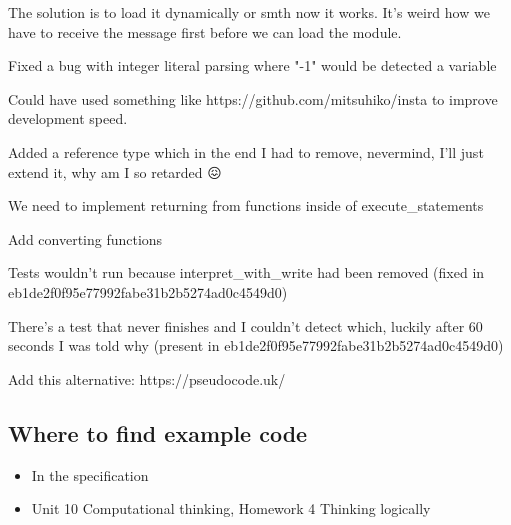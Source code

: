 \documentclass{article}
\begin{document}
The solution is to load it dynamically or smth now it works. It's weird how we
have to receive the message first before we can load the module.

Fixed a bug with integer literal parsing where "-1" would be detected a
variable

Could have used something like https://github.com/mitsuhiko/insta to improve
development speed.

Added a reference type which in the end I had to remove, nevermind, I'll just
extend it, why am I so retarded 😖

We need to implement returning from functions inside of execute\_statements

Add converting functions

Tests wouldn't run because interpret\_with\_write had been removed (fixed in
eb1de2f0f95e77992fabe31b2b5274ad0c4549d0)

There's a test that never finishes and I couldn't detect which, luckily after
60 seconds I was told why (present in eb1de2f0f95e77992fabe31b2b5274ad0c4549d0)

Add this alternative: https://pseudocode.uk/

\subsection{Where to find example code}

\begin{itemize}
	\item In the specification
	\item Unit 10 Computational thinking, Homework 4 Thinking logically
\end{itemize}

\printbibliography[heading=bibintoc]
\end{document}

